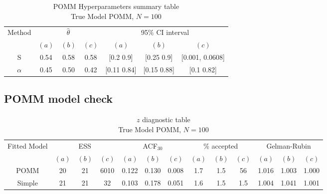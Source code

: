 \documentclass[11pt]{amsart}
\begin{document}
\begin{table}[htbp]
\centering
\caption*{
{\large POMM Hyperparameters summary table} \\ 
{\small True Model POMM, $N=100$}
} 
\begin{tabular}{ccccccc}
\toprule
\multirow{2}{*}{Method} & \multicolumn{3}{c}{
$\hat{\theta}$} & \multicolumn{3}{c}{
95$\%$ CI interval}  \\
\cmidrule(lr){2-4} \cmidrule(lr){5-7} 
& $(a)$ & $(b)$ & $(c)$ & $(a)$ & $(b)$ & $(c)$  \\
\midrule
S  &0.54 & 0.58 & 0.58 & [0.2	0.9] & [0.25	0.9] & [0.001,	0.0608]   \\
$\alpha$ & 0.45& 0.50& 0.42 & [0.11	0.84] & [0.15	0.88] & [0.1	0.82] \\
\bottomrule
\end{tabular}
\label{table:simulations_from_simple}
\end{table}


\subsection{POMM model check}



\begin{table}[htbp]
\centering
\caption*{
{\large $z$ diagnostic table} \\ 
{\small True Model POMM, $N=100$}
} 
\begin{tabular}{ccccccccccccc}
\toprule
\multirow{2}{*}{Fitted Model} & \multicolumn{3}{c}{ESS} & \multicolumn{3}{c}{
ACF$_{30}$} & \multicolumn{3}{c}{$\%$ accepted} & \multicolumn{3}{c}{Gelman-Rubin}\\
\cmidrule(lr){2-4} \cmidrule(lr){5-7} \cmidrule(lr){8-10} \cmidrule(lr){11-13} 
& $(a)$ & $(b)$ & $(c)$ & $(a)$ & $(b)$ & $(c)$ & $(a)$ & $(b)$ & $(c)$ & $(a)$ & $(b)$ & $(c)$ \\
\midrule
POMM &20 & 21 & 6010 & 0.122 & 0.130 & 0.008 & 1.7 & 1.5 & 56 & 1.016 & 1.003 & 1.000  \\
Simple &21 & 21 & 32 & 0.103 & 0.178 & 0.051 & 1.6 & 1.5 & 1.5 & 1.004 & 1.041 & 1.001   \\
\bottomrule
\end{tabular}
\label{table:simulations_from_simple}
\end{table}
\end{document}
